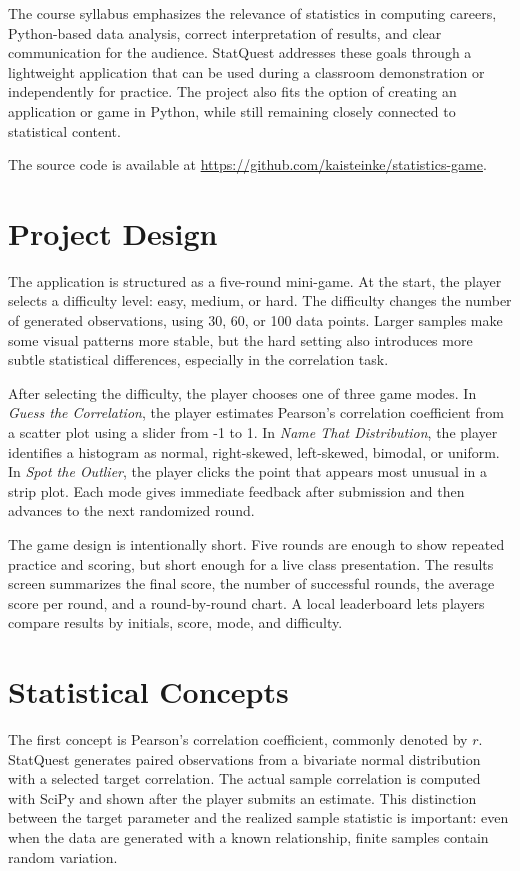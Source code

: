 \documentclass[conference]{IEEEtran}
\begin{document}
The course syllabus emphasizes the relevance of statistics in computing careers, Python-based data analysis, correct interpretation of results, and clear communication for the audience. StatQuest addresses these goals through a lightweight application that can be used during a classroom demonstration or independently for practice. The project also fits the option of creating an application or game in Python, while still remaining closely connected to statistical content.

The source code is available at \url{https://github.com/kaisteinke/statistics-game}.

\section{Project Design}
The application is structured as a five-round mini-game. At the start, the player selects a difficulty level: easy, medium, or hard. The difficulty changes the number of generated observations, using 30, 60, or 100 data points. Larger samples make some visual patterns more stable, but the hard setting also introduces more subtle statistical differences, especially in the correlation task.

After selecting the difficulty, the player chooses one of three game modes. In \textit{Guess the Correlation}, the player estimates Pearson's correlation coefficient from a scatter plot using a slider from -1 to 1. In \textit{Name That Distribution}, the player identifies a histogram as normal, right-skewed, left-skewed, bimodal, or uniform. In \textit{Spot the Outlier}, the player clicks the point that appears most unusual in a strip plot. Each mode gives immediate feedback after submission and then advances to the next randomized round.

The game design is intentionally short. Five rounds are enough to show repeated practice and scoring, but short enough for a live class presentation. The results screen summarizes the final score, the number of successful rounds, the average score per round, and a round-by-round chart. A local leaderboard lets players compare results by initials, score, mode, and difficulty.

\section{Statistical Concepts}
The first concept is Pearson's correlation coefficient, commonly denoted by $r$. StatQuest generates paired observations from a bivariate normal distribution with a selected target correlation. The actual sample correlation is computed with SciPy and shown after the player submits an estimate. This distinction between the target parameter and the realized sample statistic is important: even when the data are generated with a known relationship, finite samples contain random variation.
\end{document}
